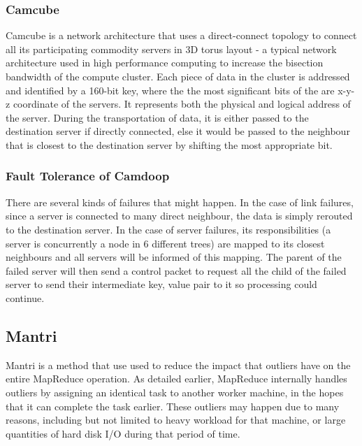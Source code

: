 \documentclass[]{article}
\begin{document}
\subsubsection{Camcube}
Camcube is a network architecture that uses a direct-connect topology to connect all its participating commodity servers in 3D torus layout - a typical network architecture used in high performance computing to increase the bisection bandwidth of the compute cluster. Each piece of data in the cluster is addressed and identified by a 160-bit key, where the the most significant bits of the are x-y-z coordinate of the servers. It represents both the physical and logical address of the server. During the transportation of data, it is either passed to the destination server if directly connected, else it would be passed to the neighbour that is closest to the destination server by shifting the most appropriate bit.\\

\subsubsection{Fault Tolerance of Camdoop}
There are several kinds of failures that might happen. In the case of link failures, since a server is connected to many direct neighbour, the data is simply rerouted to the destination server. In the case of server failures, its responsibilities (a server is concurrently a node in 6 different trees) are mapped to its closest neighbours and all servers will be informed of this mapping. The parent of the failed server will then send a control packet to request all the child of the failed server to send their intermediate key, value pair to it so processing could continue.\\




\subsection{Mantri}
Mantri is a method that use used to reduce the impact that outliers have on the entire MapReduce operation. As detailed earlier, MapReduce internally handles outliers by assigning an identical task to another worker machine, in the hopes that it can complete the task earlier. These outliers may happen due to many reasons, including but not limited to heavy workload for that machine, or large quantities of hard disk I/O during that period of time. \\
\end{document}
